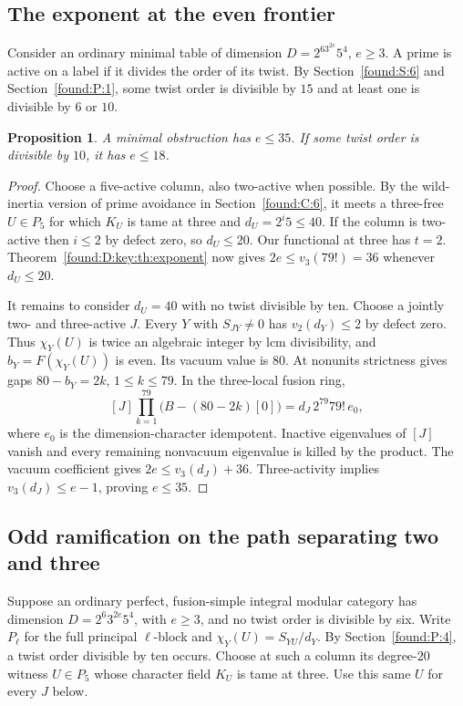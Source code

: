 \documentclass[11pt,a4paper]{article}
\numberwithin{equation}{section}
\newtheorem{proposition}[theorem]{Proposition}
\theoremstyle{remark}
\begin{document}
\subsection{The exponent at the even frontier}\label{found:D:4}
Consider an ordinary minimal table of dimension $D=2^63^{2e}5^4$, $e\ge3$. A prime is active on a label if it divides the order of its twist. By Section~\ref{found:S:6} and Section~\ref{found:P:1}, some twist order is divisible by $15$ and at least one is divisible by $6$ or $10$.
\begin{proposition}\label{found:D:4.1}\label{found:D:key:pr:dyadic}
A minimal obstruction has $e\le35$. If some twist order is divisible by $10$, it has $e\le18$.
\end{proposition}
\begin{proof}
Choose a five-active column, also two-active when possible. By the wild-inertia version of prime avoidance in Section~\ref{found:C:6}, it meets a three-free $U\in P_5$ for which $K_U$ is tame at three and $d_U=2^i5\le40$. If the column is two-active then $i\le2$ by defect zero, so $d_U\le20$. Our functional at three has $t=2$. Theorem~\ref{found:D:key:th:exponent} now gives $2e\le v_3(79!)=36$ whenever $d_U\le20$.

It remains to consider $d_U=40$ with no twist divisible by ten. Choose a jointly two- and three-active $J$. Every $Y$ with $S_{JY}\ne0$ has $v_2(d_Y)\le2$ by defect zero. Thus $\chi_Y(U)$ is twice an algebraic integer by lcm divisibility, and $b_Y=F(\chi_Y(U))$ is even. Its vacuum value is $80$. At nonunits strictness gives gaps $80-b_Y=2k$, $1\le k\le79$. In the three-local fusion ring,
\[
 [J]\prod_{k=1}^{79}\big(B-(80-2k)[0]\big)
       =d_J\,2^{79}79!\,e_0 ,
\]
where $e_0$ is the dimension-character idempotent. Inactive eigenvalues of $[J]$ vanish and every remaining nonvacuum eigenvalue is killed by the product. The vacuum coefficient gives $2e\le v_3(d_J)+36$. Three-activity implies $v_3(d_J)\le e-1$, proving $e\le35$.
\end{proof}

\subsection{Odd ramification on the path separating two and three}\label{found:D:5}
Suppose an ordinary perfect, fusion-simple integral modular category has
dimension $D=2^6 3^{2e}5^4$, with $e\ge3$, and no twist order is
divisible by six. Write $P_\ell$ for the full principal $\ell$-block and
$\chi_Y(U)=S_{YU}/d_Y$. By Section~\ref{found:P:4}, a twist order divisible by ten
occurs. Choose at such a column its degree-$20$ witness $U\in P_5$ whose
character field $K_U$ is tame at three. Use this same $U$ for every $J$ below.
\end{document}
